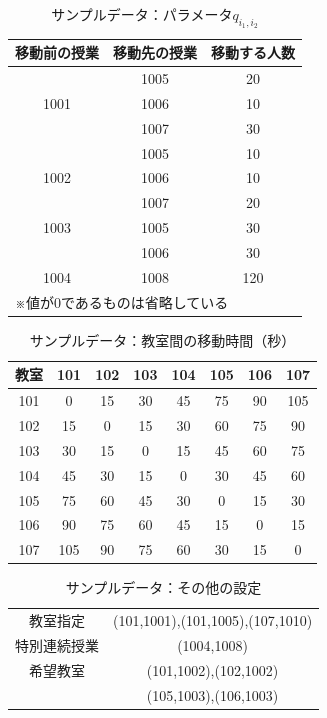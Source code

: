 \documentclass[12pt, a4paper, fleqn]{jreport}
\begin{document}
\begin{table}[H]
\caption{サンプルデータ：パラメータ$q_{i_1,i_2}$}
\label{d:normal_information}
\begin{center}
\begin{tabular}{c|cc}
\hline
 移動前の授業 & 移動先の授業 & 移動する人数 \\
\hline\hline
     & 1005 & 20 \\
1001 & 1006 & 10 \\
     & 1007 & 30 \\
\hline
     & 1005 & 10 \\
1002 & 1006 & 10 \\
     & 1007 & 20 \\
\hline
1003 & 1005 & 30 \\
     & 1006 & 30 \\
\hline
1004 & 1008 & 120 \\
\hline
 \multicolumn{3}{l}{※値が0であるものは省略している}
\end{tabular}
\end{center}
\end{table}

\begin{table}[H]
\caption{サンプルデータ：教室間の移動時間（秒）}
\label{e:normal_information}
\begin{center}
\begin{tabular}{c|ccccccc}
\hline
教室 & 101 & 102 & 103 & 104 & 105 & 106 & 107 \\
\hline\hline
 101 & 0   &  15 &   30 &   45  & 75  &  90 &  105 \\
 102 & 15  &  0  &   15 &   30  & 60  &  75 &  90  \\
 103 & 30  &  15 &   0  &   15  & 45  &  60 &  75  \\
 104 & 45  &  30 &   15 &   0   & 30  &  45 &  60  \\
 105 & 75  &  60 &   45 &   30  & 0   &  15 &  30  \\
 106 & 90  &  75 &   60 &   45  & 15  &  0  &  15  \\	
 107 & 105 &  90 &   75 &   60  & 30  &  15 &  0   \\
\hline
\end{tabular}
\end{center}
\end{table}

\begin{table}[H]
\caption{サンプルデータ：その他の設定}
\label{f:normal_information}
\begin{center}
\begin{tabular}{c|c}
\hline
教室指定 & (101,1001),(101,1005),(107,1010) \\
特別連続授業 & (1004,1008)\\
希望教室 & (101,1002),(102,1002)\\
& (105,1003),(106,1003)\\
\hline
\end{tabular}
\end{center}
\end{table}
\end{document}
